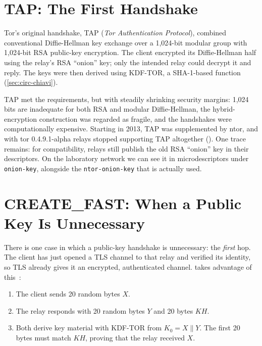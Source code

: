 \section{TAP: The First Handshake}\label{sec:tap}

Tor's original handshake, TAP (\emph{Tor Authentication Protocol}), combined conventional Diffie-Hellman key exchange over a 1,024-bit modular group with 1,024-bit RSA public-key encryption. The client encrypted its Diffie-Hellman half using the relay's RSA \enquote{onion} key; only the intended relay could decrypt it and reply. The keys were then derived using KDF-TOR, a SHA-1-based function (\cref{sec:circ-chiavi}).

TAP met the requirements, but with steadily shrinking security margins: 1,024 bits are inadequate for both RSA and modular Diffie-Hellman, the hybrid-encryption construction was regarded as fragile, and the handshakes were computationally expensive. Starting in 2013, TAP was supplemented by ntor, and with tor 0.4.9.1-alpha relays stopped supporting TAP altogether (). One trace remains: for compatibility, relays still publish the old RSA \enquote{onion} key in their descriptors. On the laboratory network we can see it in microdescriptors under \texttt{onion-key}, alongside the \texttt{ntor-onion-key} that is actually used.

\section{CREATE\_FAST: When a Public Key Is Unnecessary}\label{sec:create-fast}

There is one case in which a public-key handshake is unnecessary: the \emph{first} hop. The client has just opened a TLS channel to that relay and verified its identity, so TLS already gives it an encrypted, authenticated channel.  takes advantage of this~:
\begin{enumerate}
  \item The client sends 20 random bytes $X$.
  \item The relay responds with 20 random bytes $Y$ and 20 bytes $KH$.
  \item Both derive key material with KDF-TOR from $K_0 = X \| Y$. The first 20 bytes must match $KH$, proving that the relay received $X$.
\end{enumerate}

